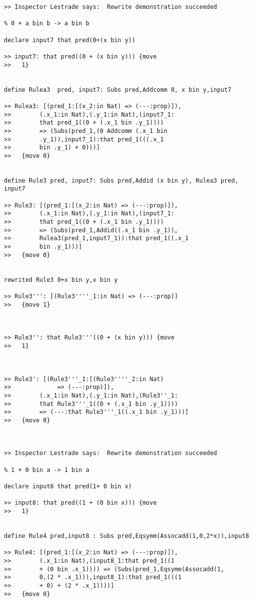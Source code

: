 \documentclass{article}
\begin{document}
\begin{verbatim}
>> Inspector Lestrade says:  Rewrite demonstration succeeded

% 0 + a bin b -> a bin b

declare input7 that pred(0+(x bin y))

>> input7: that pred((0 + (x bin y))) {move 
>>   1}


define Rulea3  pred, input7: Subs pred,Addcomm 0, x bin y,input7

>> Rulea3: [(pred_1:[(x_2:in Nat) => (---:prop)]),
>>        (.x_1:in Nat),(.y_1:in Nat),(input7_1:
>>        that pred_1((0 + (.x_1 bin .y_1)))) 
>>        => (Subs(pred_1,(0 Addcomm (.x_1 bin 
>>        .y_1)),input7_1):that pred_1(((.x_1 
>>        bin .y_1) + 0)))]
>>   {move 0}


define Rule3 pred, input7: Subs pred,Addid (x bin y), Rulea3 pred, input7

>> Rule3: [(pred_1:[(x_2:in Nat) => (---:prop)]),
>>        (.x_1:in Nat),(.y_1:in Nat),(input7_1:
>>        that pred_1((0 + (.x_1 bin .y_1)))) 
>>        => (Subs(pred_1,Addid((.x_1 bin .y_1)),
>>        Rulea3(pred_1,input7_1)):that pred_1((.x_1 
>>        bin .y_1)))]
>>   {move 0}


rewrited Rule3 0+x bin y,x bin y

>> Rule3''': [(Rule3''''_1:in Nat) => (---:prop)]
>>   {move 1}



>> Rule3'': that Rule3'''((0 + (x bin y))) {move 
>>   1}



>> Rule3': [(Rule3'''_1:[(Rule3''''_2:in Nat) 
>>             => (---:prop)]),
>>        (.x_1:in Nat),(.y_1:in Nat),(Rule3''_1:
>>        that Rule3'''_1((0 + (.x_1 bin .y_1)))) 
>>        => (---:that Rule3'''_1((.x_1 bin .y_1)))]
>>   {move 0}



>> Inspector Lestrade says:  Rewrite demonstration succeeded

% 1 + 0 bin a -> 1 bin a

declare input8 that pred(1+ 0 bin x)

>> input8: that pred((1 + (0 bin x))) {move 
>>   1}


define Rule4 pred,input8 : Subs pred,Eqsymm(Assocadd(1,0,2*x)),input8

>> Rule4: [(pred_1:[(x_2:in Nat) => (---:prop)]),
>>        (.x_1:in Nat),(input8_1:that pred_1((1 
>>        + (0 bin .x_1)))) => (Subs(pred_1,Eqsymm(Assocadd(1,
>>        0,(2 * .x_1))),input8_1):that pred_1(((1 
>>        + 0) + (2 * .x_1))))]
>>   {move 0}



\end{verbatim}
\end{document}
